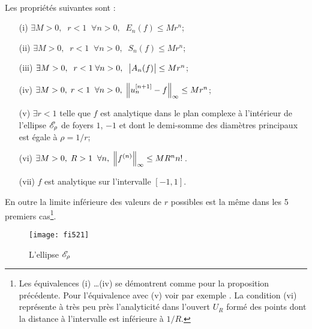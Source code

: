 \smallskip{} \\
Les propriétés suivantes sont \equivas:   
\begin{itemize}\itemsep2pt
\item [(i)] $ \exists M > 0, \; \; r < 1 \; \; \forall n> 0, \; \; E_n(f) \leq Mr^n$;

\item [(ii)] $\exists M > 0, \; \; r < 1 \; \; \forall n> 0, \; \; S_n(f) \leq Mr^n$; 

\item [(iii)] $\exists M >0, \; \; r < 1 \; \forall n> 0, \; \; \big|{A_n(f)}\big| \leq Mr^n $;

\item [(iv)] $ \exists M > 0, \;  r < 1 \; \; \forall n> 0,  \; \Big\lVert  u_n^{[n+1]} - f  \Big\rVert_{\infty}   \leq Mr^n$;

\item [(v)] $\exists r < 1$ 
telle que  $f$ est analytique dans le plan complexe à l'intérieur                      
de l'ellipse  $\sE_\rho$  de foyers  $1$, $-1$  et dont le demi-somme des                      
diamètres principaux est égale  à  $\rho = 1/r$;

\item [(vi)] $ \exists M > 0, \;  R > 1 \; \; \forall n, \;  \Big\lVert f^{(n)}  \Big\rVert_{\infty}  \leq MR^nn!$\,.

\item [(vii)]  $f$ est analytique sur l'intervalle $[-1,1]$.
\end{itemize}
En outre la limite inférieure des valeurs de  $r$  possibles est la même 
dans les  5 premiers cas{\footnote{Les équivalences   (i) \ldots (iv)  se 
démontrent comme pour la proposition précédente.  Pour l'équivalence avec  
(v)  voir par exemple \cite{fRi}.  La condition  (vi)   représente à très 
peu près l'analyticité dans l'ouvert  $U_R$  formé des points dont la 
distance à l'intervalle est inférieure à  $1/R$.}}.

\begin{figure}[htbp]  
\begin{center}
\texttt{[image: fi521]}
\end{center}
\caption[L'ellipse $\sE_\rho$]{\label{ffi521}  
L'ellipse $\sE_\rho$}  
\end{figure}  

